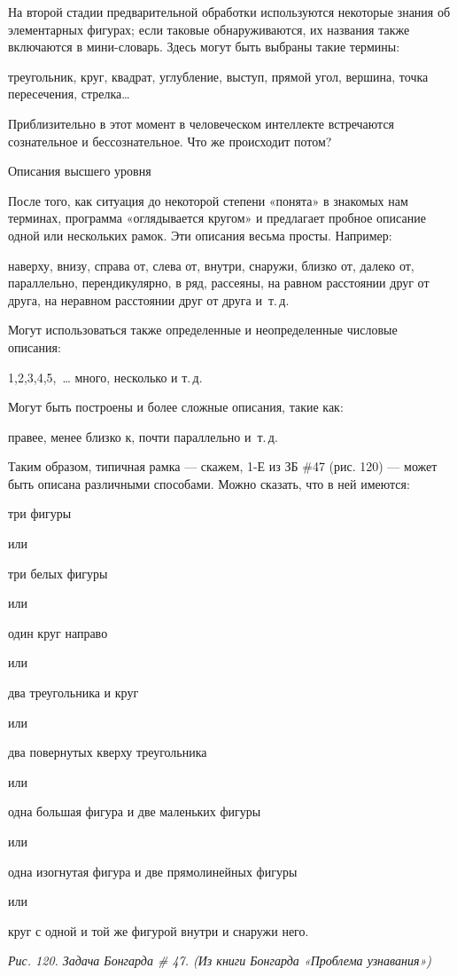 \documentclass[../main.tex]{subfiles}
\begin{document}
На второй стадии предварительной обработки используются некоторые знания об элементарных фигурах; если таковые обнаруживаются, их названия также включаются в мини-словарь. Здесь могут быть выбраны такие термины:

треугольник, круг, квадрат, углубление, выступ, прямой угол, вершина, точка пересечения, стрелка\ldots{}

Приблизительно в этот момент в человеческом интеллекте встречаются сознательное и бессознательное. Что же происходит потом?

Описания высшего уровня

После того, как ситуация до некоторой степени «понята» в знакомых нам терминах, программа «оглядывается кругом» и предлагает пробное описание одной или нескольких рамок. Эти описания весьма просты. Например:

наверху, внизу, справа от, слева от, внутри, снаружи, близко от, далеко от, параллельно, перендикулярно, в ряд, рассеяны, на равном расстоянии друг от друга, на неравном расстоянии друг от друга и~т.\,д.

Могут использоваться также определенные и неопределенные числовые описания:

1,2,3,4,5,~\ldots{} много, несколько и т.\,д.

Могут быть построены и более сложные описания, такие как:

правее, менее близко к, почти параллельно и~т.\,д.

Таким образом, типичная рамка --- скажем, 1-Е из ЗБ \#47 (рис. 120) --- может быть описана различными способами. Можно сказать, что в ней имеются:

три фигуры

или

три белых фигуры

или

один круг направо

или

два треугольника и круг

или

два повернутых кверху треугольника

или

одна большая фигура и две маленьких фигуры

или

одна изогнутая фигура и две прямолинейных фигуры

или

круг с одной и той же фигурой внутри и снаружи него.

\emph{Рис. 120. Задача Бонгарда \# 47. (Из книги Бонгарда «Проблема узнавания»)}
\end{document}
